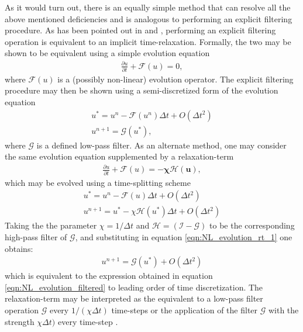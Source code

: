 As it would turn out, there is an equally simple method that can resolve all the above mentioned deficiencies and is analogous to performing an explicit filtering procedure. As has been pointed out in \cite{stolz01,mathew03} and \cite{schlatter04}, performing an explicit filtering operation is equivalent to an implicit time-relaxation. Formally, the two may be shown to be equivalent using a simple evolution equation
\begin{align}
	\frac{\partial u}{\partial t} + \mathcal{F}(u) = 0,
	\label{eqn:NL_evolution}
\end{align}
where $\mathcal{F}(u)$ is a (possibly non-linear) evolution operator. The explicit filtering procedure may then be shown using a semi-discretized form of the evolution equation
\begin{align}
	u^{*} = u^{n} - \mathcal{F}(u^{n})\Delta t + O(\Delta t^{2})\nonumber \\
	u^{n+1} =  \mathcal{G}(u^{*}), %
	\label{eqn:NL_evolution_filtered}
\end{align}
where $\mathcal{G}$ is a defined low-pass filter. As an alternate method, one may consider the same evolution equation supplemented by a relaxation-term
\begin{align}
	\frac{\partial u}{\partial t} + \mathcal{F}(u) = \boldsymbol{-\chi \mathcal{H}(u)},
	\label{eqn:NL_evolution_rt}
\end{align}
which may be evolved using a time-splitting scheme
\begin{align}
u^{*} = u^{n} -\mathcal{F}(u)\Delta t + O(\Delta t^{2})	\nonumber \\
u^{n+1} = u^{*} -\chi \mathcal{H}(u^{*})\Delta t + O(\Delta t^{2})
\label{eqn:NL_evolution_rt_1}
\end{align}
Taking the the parameter $\chi=1/\Delta t$ and $\mathcal{H}=\mathcal{(I-G)}$ to be the corresponding high-pass filter of $\mathcal{G}$, and substituting in equation \ref{eqn:NL_evolution_rt_1} one obtains:
\begin{align}
u^{n+1} = \mathcal{G}(u^{*}) + O(\Delta t^{2})
\label{eqn:NL_evolution_rt_2}
\end{align}
which is equivalent to the expression obtained in equation \ref{eqn:NL_evolution_filtered} to leading order of time discretization. The relaxation-term may be interpreted as the equivalent to a low-pass filter operation $\mathcal{G}$ every $1/(\chi\Delta t)$ time-steps \citep{stolz01,mathew03,schlatter04} or the application of the filter $\mathcal{G}$ with the strength $\chi\Delta t)$ every time-step \cite{mathew03}.

